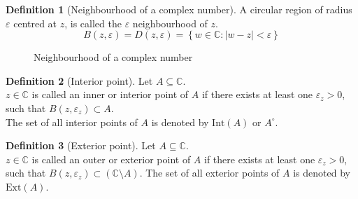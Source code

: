 \documentclass[fleqn, a4paper, 12pt, twoside]{article}
\theoremstyle{definition}
\newtheorem{definition}{Definition}
\theoremstyle{theorem}
\newcommand{\Int}{\mathrm{Int}}
\newcommand{\Ext}{\mathrm{Ext}}
\begin{document}
\begin{definition}[Neighbourhood of a complex number]
	A circular region of radius $\varepsilon$ centred at $z$, is called the $\varepsilon$ neighbourhood of $z$.
	\begin{equation*}
		B(z,\varepsilon) = D(z,\varepsilon) = \left\{ w \in \mathbb{C} : |w - z| < \varepsilon \right\}
	\end{equation*}
	\begin{figure}[h]
		\centering
		\caption{Neighbourhood of a complex number}
	\end{figure}
\end{definition}

\begin{definition}[Interior point]
	Let $A \subseteq \mathbb{C}$.\\
	$z \in \mathbb{C}$ is called an inner or interior point of $A$ if there exists at least one $\varepsilon_z > 0$, such that $B(z,\varepsilon_z) \subset A$.\\
	The set of all interior points of $A$ is denoted by $\Int(A)$ or $A^{\circ}$.
\end{definition}

\begin{definition}[Exterior point]
	Let $A \subseteq \mathbb{C}$.\\
	$z \in \mathbb{C}$ is called an outer or exterior point of $A$ if there exists at least one $\varepsilon_z > 0$, such that $B(z,\varepsilon_z) \subset (\mathbb{C} \setminus A)$.
	The set of all exterior points of $A$ is denoted by $\Ext(A)$.
\end{definition}
\end{document}
